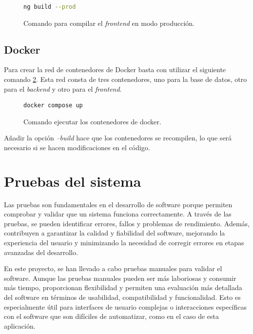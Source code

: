 \begin{figure}
	\begin{lstlisting}[language=Bash]
		ng build --prod
	\end{lstlisting}
	\caption{Comando para compilar el \textit{frontend} en modo producción.}
	\label{com:ngbuild}
\end{figure}
\subsection{Docker}
Para crear la red de contenedores de Docker basta con utilizar el siguiente comando \ref{com:dockercomposeup}. Esta red consta de tres contenedores, uno para la base de datos, otro para el \textit{backend} y otro para el \textit{frontend}.
\begin{figure}
	\begin{lstlisting}[language=Bash]
		docker compose up
	\end{lstlisting}
	\caption{Comando ejecutar los contenedores de docker.}
	\label{com:dockercomposeup}
\end{figure}
Añadir la opción \textit{--build} hace que los contenedores se recompilen, lo que será necesario si se hacen modificaciones en el código.
\section{Pruebas del sistema}
Las pruebas son fundamentales en el desarrollo de software porque permiten comprobar y validar que un sistema funciona correctamente. A través de las pruebas, se pueden identificar errores, fallos y problemas de rendimiento. Además, contribuyen a garantizar la calidad y fiabilidad del software, mejorando la experiencia del usuario y minimizando la necesidad de corregir errores en etapas avanzadas del desarrollo.

En este proyecto, se han llevado a cabo pruebas manuales para validar el software. Aunque las pruebas manuales pueden ser más laboriosas y consumir más tiempo, proporcionan flexibilidad y permiten una evaluación más detallada del software en términos de usabilidad, compatibilidad y funcionalidad. Esto es especialmente útil para interfaces de usuario complejas o interacciones específicas con el software que son difíciles de automatizar, como en el caso de esta aplicación.
